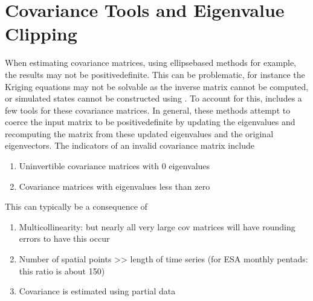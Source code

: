 \documentclass[letterpaper,10pt,english]{sphinxmanual}
\begin{document}
\section{Covariance Tools and Eigenvalue Clipping}
\label{\detokenize{misc:module-glomar_gridding.covariance_tools}}\label{\detokenize{misc:covariance-tools-and-eigenvalue-clipping}}
\sphinxAtStartPar
When estimating covariance matrices, using ellipse\sphinxhyphen{}based methods for example,
the results may not be positive\sphinxhyphen{}definite. This can be problematic, for instance
the Kriging equations may not be solvable as the inverse matrix cannot be
computed, or simulated states cannot be constructed using
{\hyperref[\detokenize{kriging:glomar_gridding.stochastic.scipy_mv_normal_draw}]{}}. To account for this,
 includes a few tools for  these covariance matrices.
In general, these methods attempt to coerce the input matrix to be
positive\sphinxhyphen{}definite by updating the eigenvalues and re\sphinxhyphen{}computing the matrix from
these updated eigenvalues and the original eigenvectors. The indicators of an
invalid covariance matrix include
\begin{enumerate}
%
\item {}
\sphinxAtStartPar
Un\sphinxhyphen{}invertible covariance matrices with 0 eigenvalues

\item {}
\sphinxAtStartPar
Covariance matrices with eigenvalues less than zero

\end{enumerate}

\sphinxAtStartPar
This can typically be a consequence of
\begin{enumerate}
%
\item {}
\sphinxAtStartPar
Multicollinearity:
but nearly all very large cov matrices will have rounding errors to have
this occur

\item {}
\sphinxAtStartPar
Number of spatial points \textgreater{}\textgreater{} length of time series
(for ESA monthly pentads: this ratio is about 150)

\item {}
\sphinxAtStartPar
Covariance is estimated using partial data

\end{enumerate}
\end{document}
